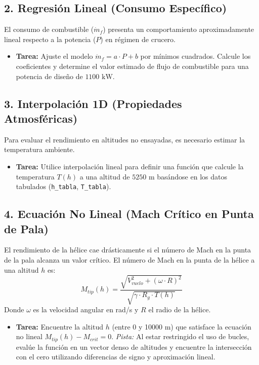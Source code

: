 	\subsection*{2. Regresión Lineal (Consumo Específico)}
	
	El consumo de combustible ($\dot{m}_f$) presenta un comportamiento aproximadamente lineal respecto a la potencia ($P$) en régimen de crucero.
	
	\begin{itemize}
		\item \textbf{Tarea:} Ajuste el modelo $\dot{m}_f = a \cdot P + b$ por mínimos cuadrados. Calcule los coeficientes y determine el valor estimado de flujo de combustible para una potencia de diseño de $1100 \text{ kW}$.
	\end{itemize}
	
	\subsection*{3. Interpolación 1D (Propiedades Atmosféricas)}
	
	Para evaluar el rendimiento en altitudes no ensayadas, es necesario estimar la temperatura ambiente.
	
	\begin{itemize}
		\item \textbf{Tarea:} Utilice interpolación lineal para definir una función que calcule la temperatura $T(h)$ a una altitud de $5250 \text{ m}$ basándose en los datos tabulados (\texttt{h\_tabla}, \texttt{T\_tabla}).
	\end{itemize}
	
	\subsection*{4. Ecuación No Lineal (Mach Crítico en Punta de Pala)}
	
	El rendimiento de la hélice cae drásticamente si el número de Mach en la punta de la pala alcanza un valor crítico. El número de Mach en la punta de la hélice a una altitud $h$ es:
	$$ M_{tip}(h) = \frac{\sqrt{V_{vuelo}^2 + (\omega \cdot R)^2}}{\sqrt{\gamma \cdot R_g \cdot T(h)}} $$
	Donde $\omega$ es la velocidad angular en rad/s y $R$ el radio de la hélice.
	
	\begin{itemize}
		\item \textbf{Tarea:} Encuentre la altitud $h$ (entre 0 y 10000 m) que satisface la ecuación no lineal $M_{tip}(h) - M_{crit} = 0$. \textit{Pista:} Al estar restringido el uso de bucles, evalúe la función en un vector denso de altitudes y encuentre la intersección con el cero utilizando diferencias de signo y aproximación lineal.
	\end{itemize}
	
